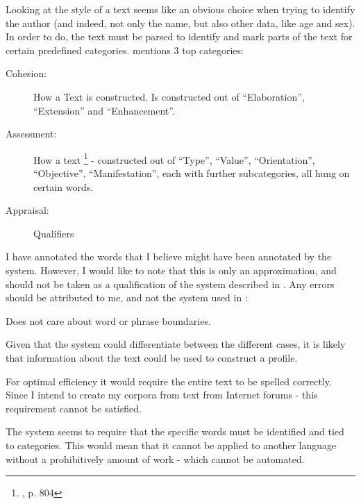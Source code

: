 {\label{stylistic}
Looking at the style of a text seems like an obvious choice when trying to identify the author (and indeed, not only the name, but also other data, like age and sex). In order to do, the text must be parsed to identify and mark parts of the text for certain predefined categories. \cite{style} mentions 3 top categories: 
\begin{description}
\item[Cohesion:] How a Text is constructed. Is constructed out of ``Elaboration'', ``Extension'' and ``Enhancement''.
\item[Assessment:] How a text \footnote{\cite{style}, p. 804} - constructed out of  ``Type'', ``Value'', ``Orientation'', ``Objective'', ``Manifestation'', each with further subcategories, all hung on certain words.
\item[Appraisal:] Qualifiers
\end{description}
}
{
I have annotated the words that I believe might have been annotated by the system. However, I would like to note that this is only an approximation, and should not be taken as a qualification of the system described in \cite{style}. Any errors should be attributed to me, and not the system used in \cite{style}:\\
}  
{
\item Does not care about word or phrase boundaries.
\item Given that the system could differentiate between the different cases, it is likely that information about the text could be used to construct a profile.
}{
\item For optimal efficiency it would require the entire text to be spelled correctly. Since I intend to create my corpora from text from Internet forums - this requirement cannot be satisfied.
\item The system seems to require that the specific words must be identified and tied to categories. This would mean that it cannot be applied to another language without a prohibitively amount of work - which cannot be automated.
} 

